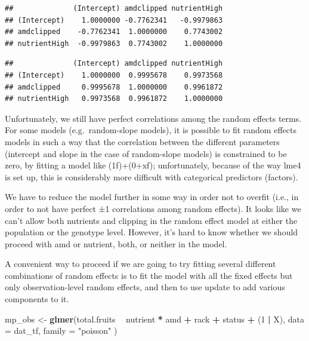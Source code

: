 \documentclass[
  12pt,
]{book}
\newenvironment{Shaded}{\begin{snugshade}}{\end{snugshade}}
\newcommand{\DataTypeTok}[1]{\textcolor[rgb]{0.13,0.29,0.53}{#1}}
\newcommand{\DecValTok}[1]{\textcolor[rgb]{0.00,0.00,0.81}{#1}}
\newcommand{\KeywordTok}[1]{\textcolor[rgb]{0.13,0.29,0.53}{\textbf{#1}}}
\newcommand{\NormalTok}[1]{#1}
\newcommand{\OperatorTok}[1]{\textcolor[rgb]{0.81,0.36,0.00}{\textbf{#1}}}
\newcommand{\StringTok}[1]{\textcolor[rgb]{0.31,0.60,0.02}{#1}}
\begin{document}
\begin{verbatim}
##              (Intercept) amdclipped nutrientHigh
## (Intercept)    1.0000000 -0.7762341   -0.9979863
## amdclipped    -0.7762341  1.0000000    0.7743002
## nutrientHigh  -0.9979863  0.7743002    1.0000000
\end{verbatim}

\begin{Shaded}
\end{Shaded}

\begin{verbatim}
##              (Intercept) amdclipped nutrientHigh
## (Intercept)    1.0000000  0.9995678    0.9973568
## amdclipped     0.9995678  1.0000000    0.9961872
## nutrientHigh   0.9973568  0.9961872    1.0000000
\end{verbatim}

Unfortunately, we still have perfect correlations among the random effects terms. For some models (e.g.~random-slope models), it is possible to fit random effects models in such a way that the correlation between the different parameters (intercept and slope in the case of random-slope models) is constrained to be zero, by fitting a model like (1\textbar f)+(0+x\textbar f); unfortunately, because of the way lme4 is set up, this is considerably more difficult with categorical predictors (factors).

We have to reduce the model further in some way in order not to overfit (i.e., in order to not have perfect ±1 correlations among random effects). It looks like we can't allow both nutrients and clipping in the random effect model at either the population or the genotype level. However, it's hard to know whether we should proceed with amd or nutrient, both, or neither in the model.

A convenient way to proceed if we are going to try fitting several different combinations of random effects is to fit the model with all the fixed effects but only observation-level random effects, and then to use update to add various components to it.

\begin{Shaded}
\begin{Highlighting}[]
\NormalTok{mp_obs <-}\StringTok{ }\KeywordTok{glmer}\NormalTok{(total.fruits }\OperatorTok{~}\StringTok{ }\NormalTok{nutrient }\OperatorTok{*}\StringTok{ }\NormalTok{amd }\OperatorTok{+}
\StringTok{  }\NormalTok{rack }\OperatorTok{+}\StringTok{ }\NormalTok{status }\OperatorTok{+}
\StringTok{  }\NormalTok{(}\DecValTok{1} \OperatorTok{|}\StringTok{ }\NormalTok{X),}
\DataTypeTok{data =}\NormalTok{ dat_tf, }\DataTypeTok{family =} \StringTok{"poisson"}
\NormalTok{)}
\end{Highlighting}
\end{Shaded}
\end{document}
